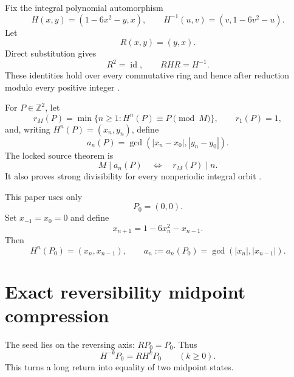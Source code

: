 \documentclass[11pt]{article}
\numberwithin{equation}{section}
\theoremstyle{remark}
\newcommand{\Z}{\mathbb Z}
\begin{document}
Fix the integral polynomial automorphism
\begin{equation}
 H(x,y)=(1-6x^2-y,x),
 \qquad
 H^{-1}(u,v)=(v,1-6v^2-u).
 \label{eq:henon-map}
\end{equation}
Let
\begin{equation}
 R(x,y)=(y,x).
 \label{eq:reversor}
\end{equation}
Direct substitution gives
\begin{equation}
 R^2=\operatorname{id},
 \qquad
 RHR=H^{-1}.
 \label{eq:reversibility}
\end{equation}
These identities hold over every commutative ring and hence after reduction
modulo every positive integer \citep{WangPrimeReturns2026}.

For \(P\in\Z^2\), let
\begin{equation}
 r_M(P)=\min\{n\ge1:H^n(P)\equiv P\pmod M\},
 \qquad r_1(P)=1,
 \label{eq:return-rank}
\end{equation}
and, writing \(H^n(P)=(x_n,y_n)\), define
\begin{equation}
 a_n(P)=\gcd(|x_n-x_0|,|y_n-y_0|).
 \label{eq:gcd-sequence-general}
\end{equation}
The locked source theorem is
\begin{equation}
 M\mid a_n(P)
 \quad\Longleftrightarrow\quad
 r_M(P)\mid n.
 \label{eq:return-divisibility}
\end{equation}
It also proves strong divisibility for every nonperiodic integral orbit
\citep{Silverman2007,WangPrimeReturns2026}.

This paper uses only
\begin{equation}
 P_0=(0,0).
 \label{eq:seed}
\end{equation}
Set \(x_{-1}=x_0=0\) and define
\begin{equation}
 x_{n+1}=1-6x_n^2-x_{n-1}.
 \label{eq:scalar-recurrence}
\end{equation}
Then
\begin{equation}
 H^n(P_0)=(x_n,x_{n-1}),
 \qquad
 a_n:=a_n(P_0)=\gcd(|x_n|,|x_{n-1}|).
 \label{eq:orbit-indexing}
\end{equation}

\section{Exact reversibility midpoint compression}

The seed lies on the reversing axis: \(RP_0=P_0\).  Thus
\begin{equation}
 H^{-k}P_0=RH^kP_0
 \qquad(k\ge0).
 \label{eq:reversed-orbit}
\end{equation}
This turns a long return into equality of two midpoint states.
\end{document}
